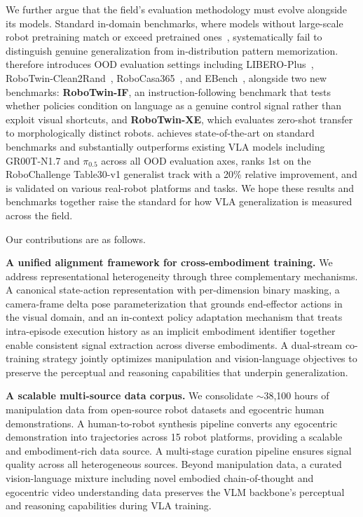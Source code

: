 We further argue that the field's evaluation methodology must evolve alongside its models. Standard in-domain benchmarks, where models without large-scale robot pretraining match or exceed pretrained ones~\citep{Yan_2025_ICCV,community2026starvla}, systematically fail to distinguish genuine generalization from in-distribution pattern memorization.
\ours therefore introduces OOD evaluation settings including LIBERO-Plus~\citep{fei2025liberoplus}, RoboTwin-Clean2Rand~\citep{mu2025robotwin}, RoboCasa365~\citep{nasiriany2026robocasa365}, and EBench~\citep{ebench2026}, alongside two new benchmarks: \textbf{RoboTwin-IF}, an instruction-following benchmark that tests whether policies condition on language as a genuine control signal rather than exploit visual shortcuts, and \textbf{RoboTwin-XE}, which evaluates zero-shot transfer to morphologically distinct robots. 
\ours achieves state-of-the-art on standard benchmarks and substantially outperforms existing VLA models including GR00T-N1.7 and $\pi_{0.5}$ across all OOD evaluation axes, ranks 1st on the RoboChallenge Table30-v1 generalist track with a 20\% relative improvement, and is validated on various real-robot platforms and tasks. We hope these results and benchmarks together raise the standard for how VLA generalization is measured across the field.

Our contributions are as follows.

\textbf{A unified alignment framework for cross-embodiment training.} We address representational heterogeneity through three complementary mechanisms. A canonical state-action representation with per-dimension binary masking, a camera-frame delta pose parameterization that grounds end-effector actions in the visual domain, and an in-context policy adaptation mechanism that treats intra-episode execution history as an implicit embodiment identifier together enable consistent signal extraction across diverse embodiments. A dual-stream co-training strategy jointly optimizes manipulation and vision-language objectives to preserve the perceptual and reasoning capabilities that underpin generalization.

\textbf{A scalable multi-source data corpus.} We consolidate $\sim$38,100 hours of manipulation data from open-source robot datasets and egocentric human demonstrations. A human-to-robot synthesis pipeline converts any egocentric demonstration into trajectories across 15 robot platforms, providing a scalable and embodiment-rich data source. A multi-stage curation pipeline ensures signal quality across all heterogeneous sources.
Beyond manipulation data, a curated vision-language mixture including novel embodied chain-of-thought and egocentric video understanding data preserves the VLM backbone's perceptual and reasoning capabilities during VLA training.

